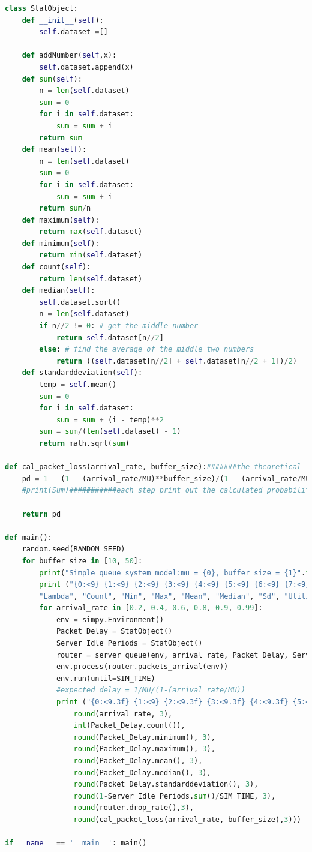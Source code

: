 \documentclass[paper=a4, fontsize=11pt]{scrartcl}
\numberwithin{equation}{section} %
\numberwithin{figure}{section} %
\numberwithin{table}{section} %
\begin{document}
\begin{lstlisting}[language=Python]
class StatObject:
    def __init__(self):
        self.dataset =[]

    def addNumber(self,x):
        self.dataset.append(x)
    def sum(self):
        n = len(self.dataset)
        sum = 0
        for i in self.dataset:
            sum = sum + i
        return sum
    def mean(self):
        n = len(self.dataset)
        sum = 0
        for i in self.dataset:
            sum = sum + i
        return sum/n
    def maximum(self):
        return max(self.dataset)
    def minimum(self):
        return min(self.dataset)
    def count(self):
        return len(self.dataset)
    def median(self):
        self.dataset.sort()
        n = len(self.dataset)
        if n//2 != 0: # get the middle number
            return self.dataset[n//2]
        else: # find the average of the middle two numbers
            return ((self.dataset[n//2] + self.dataset[n//2 + 1])/2)
    def standarddeviation(self):
        temp = self.mean()
        sum = 0
        for i in self.dataset:
            sum = sum + (i - temp)**2
        sum = sum/(len(self.dataset) - 1)
        return math.sqrt(sum)

def cal_packet_loss(arrival_rate, buffer_size):#######the theoretical loss rate
    pd = 1 - (1 - (arrival_rate/MU)**buffer_size)/(1 - (arrival_rate/MU)**(buffer_size+1))
    #print(Sum)###########each step print out the calculated probability that the packet of system is <= buffer size
    
    return pd

def main():
    random.seed(RANDOM_SEED)
    for buffer_size in [10, 50]:
        print("Simple queue system model:mu = {0}, buffer size = {1}".format(MU, buffer_size))
        print ("{0:<9} {1:<9} {2:<9} {3:<9} {4:<9} {5:<9} {6:<9} {7:<9} {8:<9} {9:<9}".format(
        "Lambda", "Count", "Min", "Max", "Mean", "Median", "Sd", "Utilization", "Loss Rate", "Theoretical"))
        for arrival_rate in [0.2, 0.4, 0.6, 0.8, 0.9, 0.99]:
            env = simpy.Environment()
            Packet_Delay = StatObject()
            Server_Idle_Periods = StatObject()
            router = server_queue(env, arrival_rate, Packet_Delay, Server_Idle_Periods, buffer_size)
            env.process(router.packets_arrival(env))
            env.run(until=SIM_TIME)
            #expected_delay = 1/MU/(1-(arrival_rate/MU))
            print ("{0:<9.3f} {1:<9} {2:<9.3f} {3:<9.3f} {4:<9.3f} {5:<9.3f} {6:<9.3f} {7:<9.3f} {8:<9.3f} {9:<9.3f}".format(
                round(arrival_rate, 3),
                int(Packet_Delay.count()),
                round(Packet_Delay.minimum(), 3),
                round(Packet_Delay.maximum(), 3),
                round(Packet_Delay.mean(), 3),
                round(Packet_Delay.median(), 3),
                round(Packet_Delay.standarddeviation(), 3),
                round(1-Server_Idle_Periods.sum()/SIM_TIME, 3),
                round(router.drop_rate(),3),
                round(cal_packet_loss(arrival_rate, buffer_size),3)))

if __name__ == '__main__': main()
       \end{lstlisting}
\end{document}
